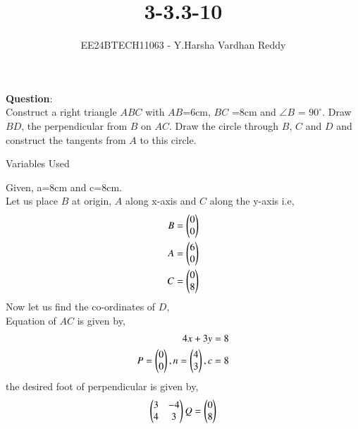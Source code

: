 \documentclass[journal]{IEEEtran}
\begin{document}

\vspace{3cm}

\title{3-3.3-10}
\author{EE24BTECH11063 - Y.Harsha Vardhan Reddy
}
{\let\newpage\relax\maketitle}

\renewcommand{\thefigure}{\theenumi}
\renewcommand{\thetable}{\theenumi}
\setlength{\intextsep}{10pt} %


\renewcommand{\thetable}{\theenumi}
\textbf{Question}:\\
Construct a right triangle $ABC$ with $AB$=6cm, $BC$ =8cm and $\angle{B}$ = $90^{\circ}$. Draw $BD$, the perpendicular from $B$ on $AC$. Draw the circle through $B$, $C$ and $D$ and construct the tangents from $A$ to this circle.
\\
\solution
\begin{table}[h!]    
  \centering
  
  \caption{Variables Used}
  \label{tab1-1.2-20}
\end{table}
Given, a=8cm and c=8cm.\\
Let us place $B$ at origin, $A$ along x-axis and $C$ along the y-axis i.e, 
\begin{align}
B = \begin{pmatrix}0\\0\end{pmatrix} \\
A = \begin{pmatrix}6\\0\end{pmatrix} \\
C = \begin{pmatrix}0\\8\end{pmatrix}
\end{align}
Now let us find the co-ordinates of $D$,\\
Equation of $AC$ is given by,\\
\begin{align}
4x+3y=8\\
    P=\begin{pmatrix}0\\0\end{pmatrix},n=\begin{pmatrix}4\\3\end{pmatrix},c=8\\
\end{align}
the desired foot of perpendicular is given by,
\begin{align}
    \begin{pmatrix}3&-4\\4&3\end{pmatrix}Q=\begin{pmatrix}0\\8\end{pmatrix}
\end{align}
\end{document}
